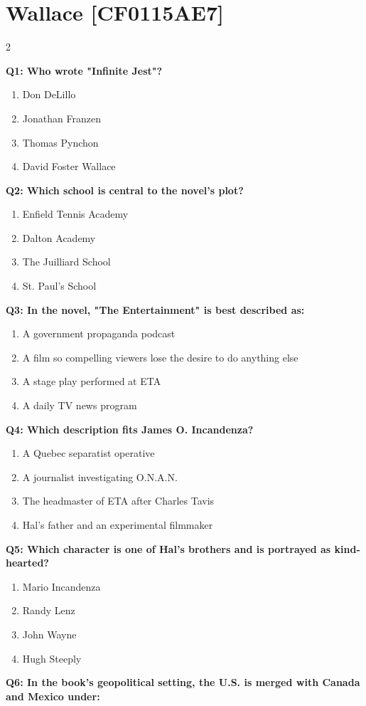 \documentclass[10pt]{article}
\begin{document}
\section*{Wallace \footnotesize [CF0115AE7]}
\begin{multicols}{2}

\textbf{Q1: Who wrote "Infinite Jest"?}

\begin{enumerate}[label=\arabic*.]
\item Don DeLillo
\item Jonathan Franzen
\item Thomas Pynchon
\item David Foster Wallace
\end{enumerate}
\textbf{Q2: Which school is central to the novel's plot?}

\begin{enumerate}[label=\arabic*.]
\item Enfield Tennis Academy
\item Dalton Academy
\item The Juilliard School
\item St. Paul's School
\end{enumerate}
\textbf{Q3: In the novel, "The Entertainment" is best described as:}

\begin{enumerate}[label=\arabic*.]
\item A government propaganda podcast
\item A film so compelling viewers lose the desire to do anything else
\item A stage play performed at ETA
\item A daily TV news program
\end{enumerate}
\textbf{Q4: Which description fits James O. Incandenza?}

\begin{enumerate}[label=\arabic*.]
\item A Quebec separatist operative
\item A journalist investigating O.N.A.N.
\item The headmaster of ETA after Charles Tavis
\item Hal's father and an experimental filmmaker
\end{enumerate}
\textbf{Q5: Which character is one of Hal's brothers and is portrayed as kind-hearted?}

\begin{enumerate}[label=\arabic*.]
\item Mario Incandenza
\item Randy Lenz
\item John Wayne
\item Hugh Steeply
\end{enumerate}
\textbf{Q6: In the book's geopolitical setting, the U.S. is merged with Canada and Mexico under:}


\end{multicols}
\end{document}
